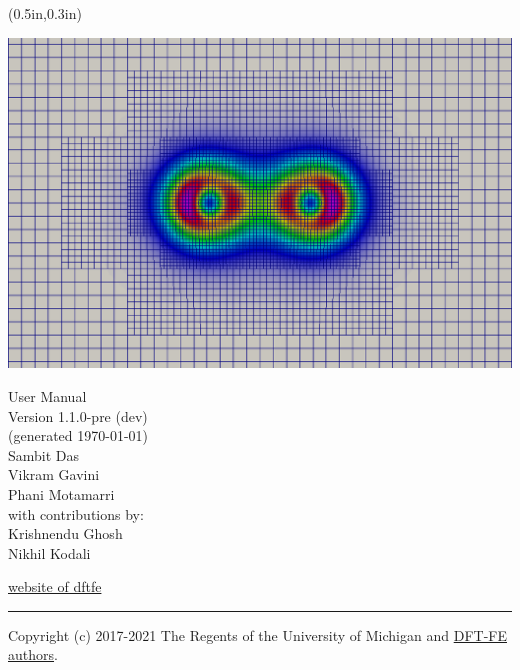 \documentclass{article}
\begin{document}
{%
\begin{textblock*}{0in}(0.5in,0.3in)
\begin{center}
\vspace{1em}
\includegraphics[scale=0.35]{N2.png}
\hspace{5em}
\end{center}
\end{textblock*}

\color{dark_grey}
\vspace{1.0em}
\hfill{\Huge \fontfamily{\sfdefault}\selectfont User Manual \\
\raggedleft \huge \fontfamily{\sfdefault}\selectfont Version
1.1.0-pre (dev) %
\\\large(generated \today)\\
\vspace{1.5em}
{\Large Sambit Das\,\\Vikram Gavini\,\\Phani Motamarri\\}
\vspace{1.0em}
\large
\noindent with contributions by: \\
    {\Large Krishnendu Ghosh\\}
    {\Large Nikhil Kodali\\}
\vspace{1.0em}
}
\null
\vspace{17em}

{\noindent
{\fontfamily{\sfdefault}\selectfont \href{https://sites.google.com/umich.edu/dftfe}{website of dftfe}}
}


{\noindent
\color{dark_grey}
\rule{\textwidth}{2pt}
}

}
Copyright (c) 2017-2021 The Regents of the University of Michigan and \hyperref[sec:authors]{DFT-FE authors}.
\pagebreak
{}
\end{document}
